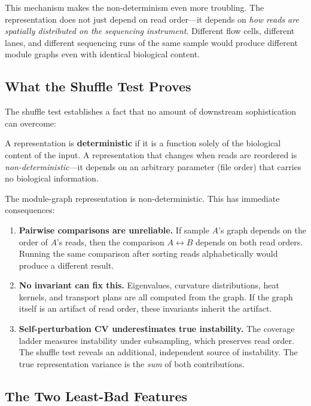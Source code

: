 \documentclass{../yalumba}
\begin{document}
This mechanism makes the non-determinism even more troubling.  The
representation does not just depend on read order---it depends on
\emph{how reads are spatially distributed on the sequencing instrument}.
Different flow cells, different lanes, and different sequencing runs of
the same sample would produce different module graphs even with
identical biological content.

\subsection{What the Shuffle Test Proves}
\label{sec:shuffle-proves}

The shuffle test establishes a fact that no amount of downstream
sophistication can overcome:

\begin{definition}
A representation is \textbf{deterministic} if it is a function solely
of the biological content of the input.  A representation that changes
when reads are reordered is \emph{non-deterministic}---it depends on
an arbitrary parameter (file order) that carries no biological
information.
\end{definition}

The module-graph representation is non-deterministic.  This has
immediate consequences:

\begin{enumerate}
  \item \textbf{Pairwise comparisons are unreliable.}  If sample $A$'s
    graph depends on the order of $A$'s reads, then the comparison
    $A \leftrightarrow B$ depends on both read orders.  Running the same
    comparison after sorting reads alphabetically would produce a
    different result.
  \item \textbf{No invariant can fix this.}  Eigenvalues,
    curvature distributions, heat kernels, and transport plans are all
    computed from the graph.  If the graph itself is an artifact of read
    order, these invariants inherit the artifact.
  \item \textbf{Self-perturbation CV underestimates true instability.}
    The coverage ladder measures instability under subsampling, which
    preserves read order.  The shuffle test reveals an additional,
    independent source of instability.  The true representation
    variance is the \emph{sum} of both contributions.
\end{enumerate}

\subsection{The Two Least-Bad Features}
\label{sec:least-bad}
\end{document}
